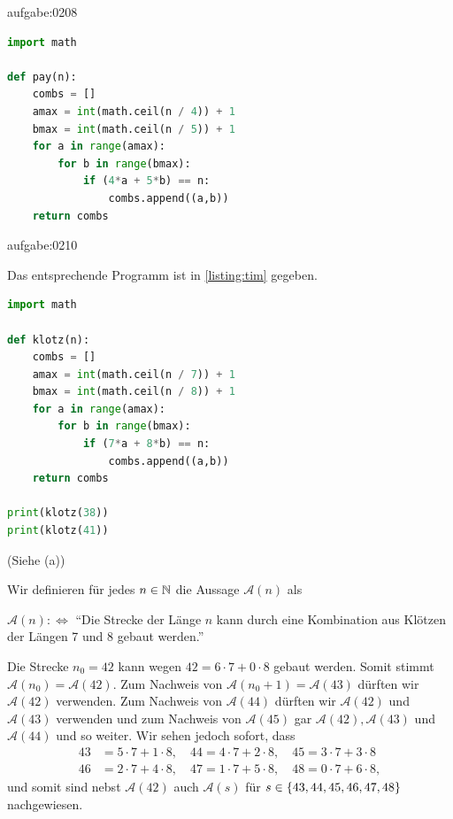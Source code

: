 \begin{antwort}{aufgabe:0208}
\begin{lstlisting}[language=Python,caption=Dollar-Betrag auszahlen]
import math

def pay(n):
    combs = []
    amax = int(math.ceil(n / 4)) + 1
    bmax = int(math.ceil(n / 5)) + 1
    for a in range(amax):
        for b in range(bmax):
            if (4*a + 5*b) == n:
                combs.append((a,b))
    return combs
\end{lstlisting}
\end{antwort}


\begin{antwort}{aufgabe:0210}
\begin{aenum}
    \item Das entsprechende Programm ist in \cref{listing:tim} gegeben.
\begin{lstlisting}[language=Python,caption=Bauklötze,label=listing:tim]
import math

def klotz(n):
    combs = []
    amax = int(math.ceil(n / 7)) + 1
    bmax = int(math.ceil(n / 8)) + 1
    for a in range(amax):
        for b in range(bmax):
            if (7*a + 8*b) == n:
                combs.append((a,b))
    return combs

print(klotz(38))
print(klotz(41))
\end{lstlisting}
    \item (Siehe (a))
    \item
Wir definieren für jedes $n\in\mathbb{N}$ die Aussage $\mathcal{A}(n)$ als
\begin{center}
    $\mathcal{A}(n) :\iff $ \enquote{Die Strecke der Länge $n$ kann durch eine Kombination aus Klötzen der Längen 7 und 8 gebaut werden.}
\end{center}
Die Strecke $n_0 = 42$ kann wegen $42 = 6\cdot 7 + 0\cdot 8$ gebaut werden. Somit stimmt $\mathcal{A}(n_0)=\mathcal{A}(42)$. Zum Nachweis von $\mathcal{A}(n_0+1)=\mathcal{A}(43)$ dürften wir $\mathcal{A}(42)$ verwenden. Zum Nachweis von $\mathcal{A}(44)$ dürften wir $\mathcal{A}(42)$ und $\mathcal{A}(43)$ verwenden und zum Nachweis von $\mathcal{A}(45)$ gar $\mathcal{A}(42), \mathcal{A}(43)$ und $\mathcal{A}(44)$ und so weiter. Wir sehen jedoch sofort, dass
\begin{align*}
    43 &= 5\cdot 7 + 1\cdot 8, \quad 44 = 4\cdot 7 + 2\cdot 8, \quad 45 = 3\cdot 7 + 3\cdot 8 \\
    46 &= 2\cdot 7 + 4\cdot 8, \quad 47 = 1\cdot 7 + 5\cdot 8, \quad 48 = 0\cdot 7 + 6\cdot 8,
\end{align*}
und somit sind nebst $\mathcal{A}(42)$ auch $\mathcal{A}(s)$ für $s\in\left\{43,44,45,46,47,48\right\}$ nachgewiesen.


\end{aenum}
\end{antwort}
